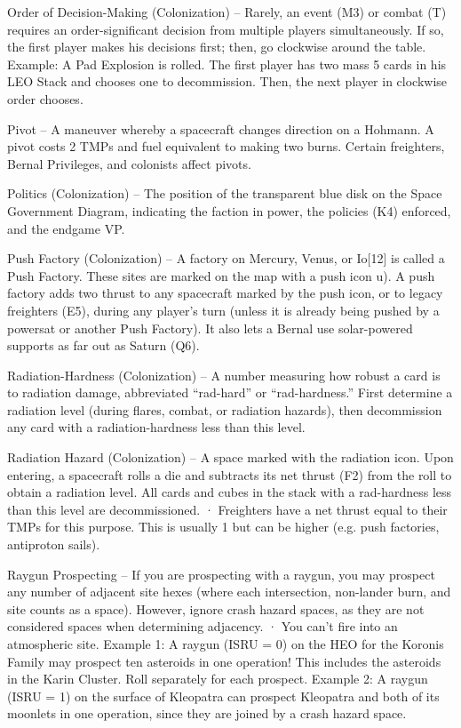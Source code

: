 \documentclass[a4paper]{book}
\begin{document}
Order of Decision-Making (Colonization) – Rarely, an event (M3) or combat (T) requires an order-significant decision from multiple players simultaneously. If so, the first player makes his decisions first; then, go clockwise around the table.
Example: A Pad Explosion is rolled. The first player has two mass 5 cards in his LEO Stack and chooses one to decommission. Then, the next player in clockwise order chooses.

Pivot – A maneuver whereby a spacecraft changes direction on a Hohmann. A pivot costs 2 TMPs and fuel equivalent to making two burns. Certain freighters, Bernal Privileges, and colonists affect pivots.

Politics (Colonization) – The position of the transparent blue disk on the Space Government Diagram, indicating the faction in power, the policies (K4) enforced, and the endgame VP.

Push Factory (Colonization) – A factory on Mercury, Venus, or Io[12] is called a Push Factory. These sites are marked on the map with a push icon u). A push factory adds two thrust to any spacecraft marked by the push icon, or to legacy freighters (E5), during any player’s turn (unless it is already being pushed by a powersat or another Push Factory). It also lets a Bernal use solar-powered supports as far out as Saturn (Q6).

Radiation-Hardness (Colonization) – A number measuring how robust a card is to radiation damage, abbreviated “rad-hard” or “rad-hardness.” First determine a radiation level (during flares, combat, or radiation hazards), then decommission any card with a radiation-hardness less than this level.

Radiation Hazard (Colonization) – A space marked with the radiation icon. Upon entering, a spacecraft rolls a die and subtracts its net thrust (F2) from the roll to obtain a radiation level. All cards and cubes in the stack with a rad-hardness less than this level are decommissioned.
·   	Freighters have a net thrust equal to their TMPs for this purpose. This is usually 1 but can be higher (e.g. push factories, antiproton sails).

Raygun Prospecting – If you are prospecting with a raygun, you may prospect any number of adjacent site hexes (where each intersection, non-lander burn, and site counts as a space). However, ignore crash hazard spaces, as they are not considered spaces when determining adjacency.
·       You can’t fire into an atmospheric site.
Example 1: A raygun (ISRU = 0) on the HEO for the Koronis Family may prospect ten asteroids in one operation! This includes the asteroids in the Karin Cluster. Roll separately for each prospect.
Example 2: A raygun (ISRU = 1) on the surface of Kleopatra can prospect Kleopatra and both of its moonlets in one operation, since they are joined by a crash hazard space.
\end{document}
